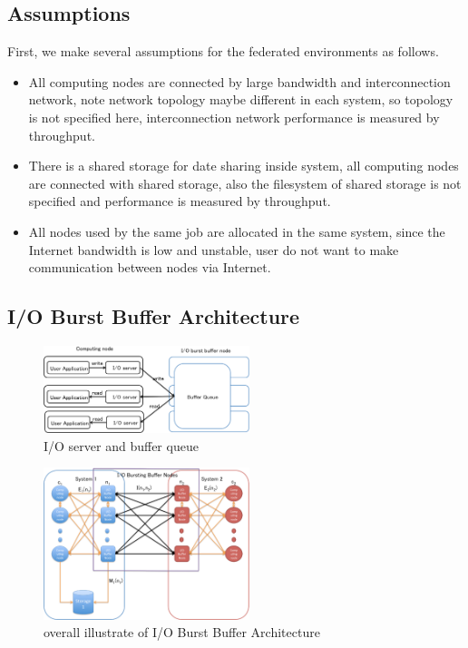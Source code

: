 \subsection{Assumptions}
First, we make several assumptions for the federated environments as follows.
\begin{itemize}
	\item All computing nodes are connected by large bandwidth and interconnection network, note network topology maybe different in each system, so topology is not specified here, interconnection network performance is measured by throughput.
	\item There is a shared storage for date sharing inside system, all computing nodes are connected with shared storage, also the filesystem of shared storage is not specified and performance is measured by throughput.
	\item All nodes used by the same job are allocated in the same system, since the Internet bandwidth is low and unstable, user do not want to make communication between nodes via Internet.%
\end{itemize}

\subsection{I/O Burst Buffer Architecture}

\begin{figure}[tb]
	\centering
	\includegraphics[width=6cm]{../img/IOserver}
	\caption{I/O server and buffer queue}
	\label{I/O server}
\end{figure}

\begin{figure}[tb]
	\centering
	\includegraphics[width=6cm]{../img/overview}
	\caption{overall illustrate of I/O Burst Buffer Architecture}
	\label{overview}
\end{figure}

